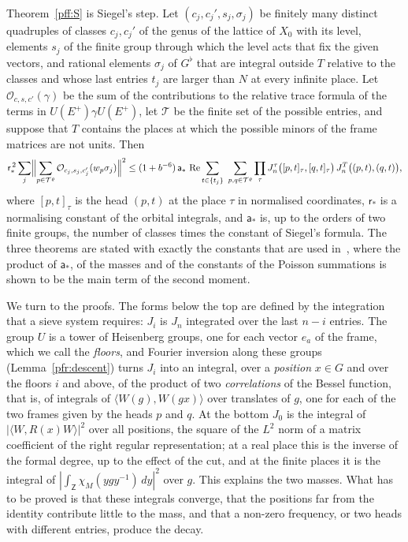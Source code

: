 \documentclass[10pt]{amsart}
\theoremstyle{definition}
\theoremstyle{remark}
\newcommand{\Rel}{\operatorname{Re}}
\begin{document}
Theorem~\ref{pff:S} is Siegel's step. Let $(c_j,c_j',s_j,\sigma_j)$ be finitely many distinct
quadruples of classes $c_j,c_j'$ of the genus of the lattice of $X_0$ with its level, elements
$s_j$ of the finite group through which the level acts that fix the given vectors, and rational
elements $\sigma_j$ of $G^\flat$ that are integral outside $T$ relative to the classes and whose
last entries $t_j$ are larger than $N$ at every infinite place. Let $\mathcal O_{c,s,c'}(\gamma)$
be the sum of the contributions to the relative trace formula of the terms in
$U(E^+)\gamma U(E^+)$, let $\mathcal T$ be the finite set of the possible entries, and suppose
that $T$ contains the places at which the possible minors of the frame matrices are not units.
Then
\[
\mathsf r_*^{\,2}\sum_{j}\Bigl\|\sum_{p\in\mathcal T^\varrho}\mathcal O_{c_j,s_j,c'_j}(w_p\sigma_j)
\Bigr\|^2\le(1+b^{-6})\,\mathsf a_*\,\Rel\sum_{t\in\{t_j\}}\ \sum_{p,q\in\mathcal T^\varrho}
\prod_\tau J^\tau_n\bigl([p,t]_\tau,[q,t]_\tau\bigr)\,J^T_n\bigl((p,t),(q,t)\bigr),
\]
where $[p,t]_\tau$ is the head $(p,t)$ at the place $\tau$ in normalised coordinates,
$\mathsf r_*$ is a normalising constant of the orbital integrals, and
$\mathsf a_*$ is, up to the orders of two finite groups, the number of classes times the
constant of Siegel's formula. The three theorems are stated with exactly the constants that are
used in~\cite{P51}, where the product of $\mathsf a_*$, of the masses and of the constants of the
Poisson summations is shown to be the main term of the second moment.

We turn to the proofs. The forms below the top are defined by the integration that a sieve system requires: $J_i$ is
$J_n$ integrated over the last $n-i$ entries. The group $U$ is a tower of Heisenberg groups, one
for each vector $e_a$ of the frame, which we call the \emph{floors}, and Fourier inversion along
these groups (Lemma~\ref{pfr:descent}) turns $J_i$ into an integral, over a \emph{position}
$x\in G$ and over the floors $i$ and above, of the product of two \emph{correlations} of the
Bessel function, that is, of integrals of $\langle W(g),W(gx)\rangle$ over translates of $g$, one
for each of the two frames given by the heads $p$ and $q$. At the bottom $J_0$ is the integral of
$|\langle W,R(x)W\rangle|^2$ over all positions, the square of the $L^2$ norm of a matrix
coefficient of the right regular representation; at a real place this is the inverse of the
formal degree, up to the effect of the cut, and at the finite places it is the integral of
$|\int_{\mathsf Z}\chi_M(ygy^{-1})\,dy|^2$ over $g$. This explains the two masses. What has to be
proved is that these integrals converge, that the positions far from the identity contribute
little to the mass, and that a non-zero frequency, or two heads with different entries, produce
the decay.
\end{document}
